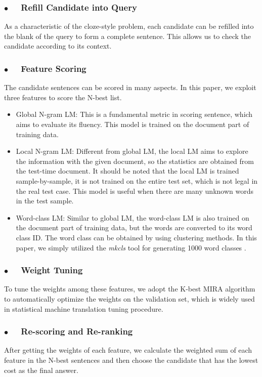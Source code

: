 \documentclass[11pt,a4paper]{article}
\begin{document}
\subsubsection*{$\bullet$~~ Refill Candidate into Query}
As a characteristic of the cloze-style problem, each candidate can be refilled into the blank of the query to form a complete sentence.
This allows us to check the candidate according to its context.

\subsubsection*{$\bullet$~~ Feature Scoring}
The candidate sentences can be scored in many aspects.
In this paper, we exploit three features to score the N-best list.

\begin{itemize}
  \item Global N-gram LM: This is a fundamental metric in scoring sentence, which aims to evaluate its fluency. This model is trained on the document part of training data.
  \item Local N-gram LM: Different from global LM, the local LM aims to explore the information with the given document, so the statistics are obtained from the test-time document. It should be noted that the local LM is trained sample-by-sample, it is not trained on the entire test set, which is not legal in the real test case. This model is useful when there are many unknown words in the test sample.
  \item Word-class  LM: Similar to global LM, the word-class LM is also trained on the document part of training data, but the words are converted to its word class ID. The word class can be obtained by using clustering methods. In this paper, we simply utilized the {\em mkcls} tool for generating 1000 word classes \cite{och-1999}.
\end{itemize}

\subsubsection*{$\bullet$~~ Weight Tuning}
To tune the weights among these features, we adopt the K-best MIRA algorithm \cite{cherry-foster:2012:NAACL-HLT} to automatically optimize the weights on the validation set, which is widely used in statistical machine translation tuning procedure.

\subsubsection*{$\bullet$~~ Re-scoring and Re-ranking}
After getting the weights of each feature, we calculate the weighted sum of each feature in the N-best sentences and then choose the candidate that has the lowest cost as the final answer.
\end{document}
